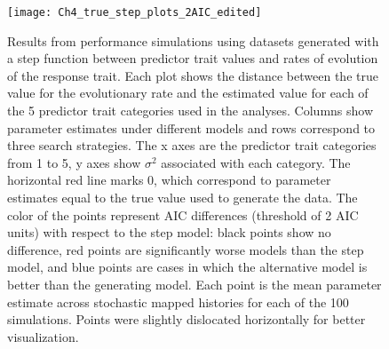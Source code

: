 \begin{figure}[h]
	\centering
	\texttt{[image: Ch4\_true\_step\_plots\_2AIC\_edited]}
	\caption[Results from performance simulations using datasets generated with a step function between predictor trait values and rates of evolution of the response trait.]{Results from performance simulations using datasets generated with a step function between predictor trait values and rates of evolution of the response trait. Each plot shows the distance between the true value for the evolutionary rate and the estimated value for each of the 5 predictor trait categories used in the analyses. Columns show parameter estimates under different models and rows correspond to three search strategies. The x axes are the predictor trait categories from 1 to 5, y axes show $\sigma^{2}$ associated with each category. The horizontal red line marks 0, which correspond to parameter estimates equal to the true value used to generate the data. The color of the points represent AIC differences (threshold of 2 AIC units) with respect to the step model: black points show no difference, red points are significantly worse models than the step model, and blue points are cases in which the alternative model is better than the generating model. Each point is the mean parameter estimate across stochastic mapped histories for each of the 100 simulations. Points were slightly dislocated horizontally for better visualization.}
	\label{fig:chart_step}
\end{figure}